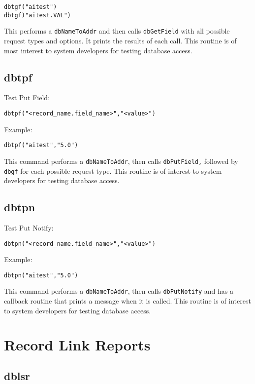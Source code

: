 \begin{verbatim}dbtgf("aitest")
dbtgf)"aitest.VAL")
\end{verbatim}This performs a \verb|dbNameToAddr| and then calls \verb|dbGetField| with all possible request types and options. It prints the 
results of each call. This routine is of most interest to system developers for testing database access.

\subsection{dbtpf}

Test Put Field:

\begin{verbatim}dbtpf("<record_name.field_name>","<value>")
\end{verbatim}Example:

\begin{verbatim}dbtpf("aitest","5.0")
\end{verbatim}This command performs a \verb|dbNameToAddr|, then calls \verb|dbPutField,| followed by \verb|dbgf| for each possible request type. 
This routine is of interest to system developers for testing database access.

\subsection{dbtpn}

Test Put Notify:

\begin{verbatim}dbtpn("<record_name.field_name>","<value>")
\end{verbatim}Example:

\begin{verbatim}dbtpn("aitest","5.0")
\end{verbatim}This command performs a \verb|dbNameToAddr|, then calls \verb|dbPutNotify| and has a callback routine that prints a message 
when it is called. This routine is of interest to system developers for testing database access.

\section{Record Link Reports}

\subsection{dblsr}


